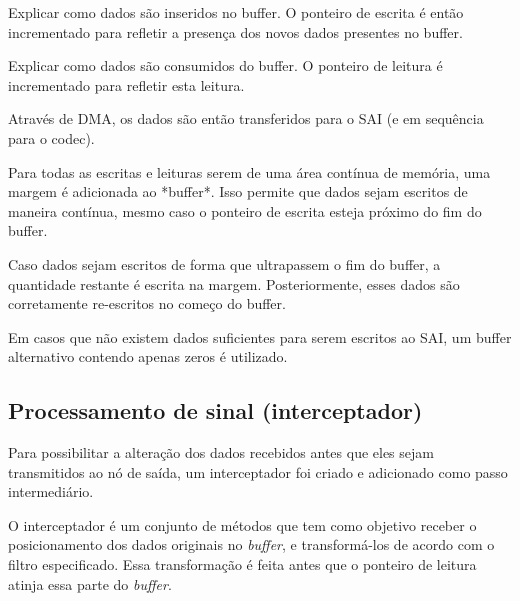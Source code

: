 \color{orange}

Explicar como dados são inseridos no buffer. O ponteiro de escrita é então incrementado para refletir a presença dos novos dados presentes no buffer.

Explicar como dados são consumidos do buffer. O ponteiro de leitura é incrementado para refletir esta leitura.
\color{black}

Através de DMA, os dados são então transferidos para o SAI (e em sequência para o codec).

Para todas as escritas e leituras serem de uma área contínua de memória, uma margem é adicionada ao *buffer*. Isso permite que dados sejam escritos de maneira contínua, mesmo caso o ponteiro de escrita esteja próximo do fim do buffer.

Caso dados sejam escritos de forma que ultrapassem o fim do buffer, a quantidade restante é escrita na margem. Posteriormente, esses dados são corretamente re-escritos no começo do buffer. 

Em casos que não existem dados suficientes para serem escritos ao SAI, um buffer alternativo contendo apenas zeros é utilizado.



\subsection{Processamento de sinal (interceptador)}
Para possibilitar a alteração dos dados recebidos antes que eles sejam transmitidos ao nó de saída, um interceptador foi criado e adicionado como passo intermediário.

O interceptador é um conjunto de métodos que tem como objetivo receber o posicionamento dos dados originais no \textit{buffer}, e transformá-los de acordo com o filtro especificado. Essa transformação é feita antes que o ponteiro de leitura atinja essa parte do \textit{buffer}.

